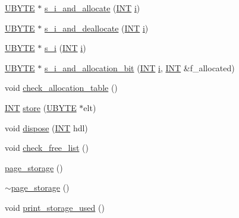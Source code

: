 \begin{DoxyCompactItemize}
\item 
\mbox{\hyperlink{galois_8h_a122c4acf389c050379f00341fdcd5812}{U\+B\+Y\+TE}} $\ast$ \mbox{\hyperlink{classpage__storage_aa43eb1ae49a6688771f7a89cbe2cd7bf}{s\+\_\+i\+\_\+and\+\_\+allocate}} (\mbox{\hyperlink{galois_8h_a09fddde158a3a20bd2dcadb609de11dc}{I\+NT}} \mbox{\hyperlink{alphabet2_8_c_acb559820d9ca11295b4500f179ef6392}{i}})
\item 
\mbox{\hyperlink{galois_8h_a122c4acf389c050379f00341fdcd5812}{U\+B\+Y\+TE}} $\ast$ \mbox{\hyperlink{classpage__storage_afbc8bf4d074acbe4bcc76ddad78793d8}{s\+\_\+i\+\_\+and\+\_\+deallocate}} (\mbox{\hyperlink{galois_8h_a09fddde158a3a20bd2dcadb609de11dc}{I\+NT}} \mbox{\hyperlink{alphabet2_8_c_acb559820d9ca11295b4500f179ef6392}{i}})
\item 
\mbox{\hyperlink{galois_8h_a122c4acf389c050379f00341fdcd5812}{U\+B\+Y\+TE}} $\ast$ \mbox{\hyperlink{classpage__storage_aab89cc6a99b0a56d04255ae00e9a0849}{s\+\_\+i}} (\mbox{\hyperlink{galois_8h_a09fddde158a3a20bd2dcadb609de11dc}{I\+NT}} \mbox{\hyperlink{alphabet2_8_c_acb559820d9ca11295b4500f179ef6392}{i}})
\item 
\mbox{\hyperlink{galois_8h_a122c4acf389c050379f00341fdcd5812}{U\+B\+Y\+TE}} $\ast$ \mbox{\hyperlink{classpage__storage_a5cd93495561a44c9c4bea8b8eef184cf}{s\+\_\+i\+\_\+and\+\_\+allocation\+\_\+bit}} (\mbox{\hyperlink{galois_8h_a09fddde158a3a20bd2dcadb609de11dc}{I\+NT}} \mbox{\hyperlink{alphabet2_8_c_acb559820d9ca11295b4500f179ef6392}{i}}, \mbox{\hyperlink{galois_8h_a09fddde158a3a20bd2dcadb609de11dc}{I\+NT}} \&f\+\_\+allocated)
\item 
void \mbox{\hyperlink{classpage__storage_afd9fbd4ce71baa0b605f61d53dbab6ea}{check\+\_\+allocation\+\_\+table}} ()
\item 
\mbox{\hyperlink{galois_8h_a09fddde158a3a20bd2dcadb609de11dc}{I\+NT}} \mbox{\hyperlink{classpage__storage_a3d04ee0a97310a8211e223ccea1d2d3f}{store}} (\mbox{\hyperlink{galois_8h_a122c4acf389c050379f00341fdcd5812}{U\+B\+Y\+TE}} $\ast$elt)
\item 
void \mbox{\hyperlink{classpage__storage_a10a87bab5f2aac2f4ddf3ebe84cf897a}{dispose}} (\mbox{\hyperlink{galois_8h_a09fddde158a3a20bd2dcadb609de11dc}{I\+NT}} hdl)
\item 
void \mbox{\hyperlink{classpage__storage_ada67dcd3273a8dff795eb8d8e60aa996}{check\+\_\+free\+\_\+list}} ()
\item 
\mbox{\hyperlink{classpage__storage_a7887e879ddae5516015edd4acc04fee8}{page\+\_\+storage}} ()
\item 
\mbox{\hyperlink{classpage__storage_a95391dd4f65d2d28da77553fcaaa2afc}{$\sim$page\+\_\+storage}} ()
\item 
void \mbox{\hyperlink{classpage__storage_a719dd1f54fd300fbc94ca2b750ed4508}{print\+\_\+storage\+\_\+used}} ()
\end{DoxyCompactItemize}
